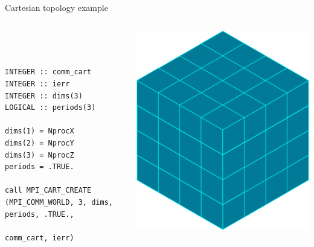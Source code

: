 \documentclass[aspectratio=43]{beamer}
\begin{document}
\begin{frame}[fragile]{Cartesian topology example}
\footnotesize
\vspace{-1.3cm}
\begin{columns}
\begin{column}{0.4\paperwidth}
\begin{verbatim}



INTEGER :: comm_cart
INTEGER :: ierr
INTEGER :: dims(3)
LOGICAL :: periods(3)

dims(1) = NprocX
dims(2) = NprocY
dims(3) = NprocZ
periods = .TRUE.

call MPI_CART_CREATE (MPI_COMM_WORLD, 3, dims, periods, .TRUE.,
                      comm_cart, ierr)
\end{verbatim}
\end{column}
\begin{column}{0.4\paperwidth}
\includegraphics[scale=0.36]{04.MPI_Topo/3dcube.pdf}
\end{column}
\end{columns}
\end{frame}
\end{document}
